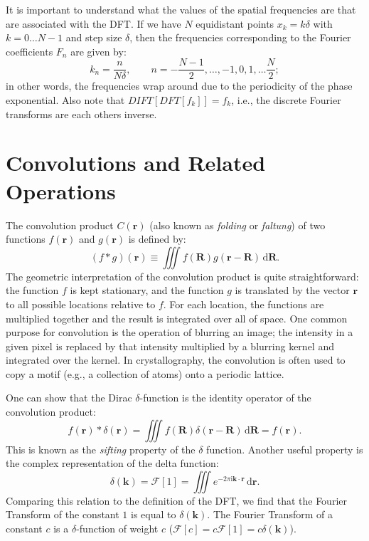It is important to understand what the values of the spatial frequencies are that are associated with the DFT.  If we have $N$ equidistant points $x_k=k\delta$ with $k=0\ldots N-1$ and step size $\delta$, then the frequencies corresponding to the Fourier coefficients $F_n$ are given by:
\[
	k_n = \frac{n}{N\delta},\qquad n=-\frac{N-1}{2},\ldots,-1,0,1,\ldots\frac{N}{2};
\]
in other words, the frequencies wrap around due to the periodicity of the phase exponential.  Also note that $DIFT[DFT[f_k]]=f_k$, i.e., the discrete Fourier transforms are each others inverse.




\section{Convolutions and Related Operations}\label{\chabbr:sec:Convolutions}

The convolution product $C(\mathbf{r})$ (also known as \textit{folding} or \textit{faltung}) of two functions $f(\mathbf{r})$ and $g(\mathbf{r})$ is defined by:
\begin{equation}
	(f\ast g)(\mathbf{r})\equiv \iiint f(\mathbf{R})g(\mathbf{r}-\mathbf{R})\,\mathrm{d}\mathbf{R}.\label{\chabbr:eq:convoldef}
\end{equation}
The geometric interpretation of the convolution product is quite straightforward: the function $f$ is kept stationary, and the function $g$ is translated by the vector $\mathbf{r}$ to all possible locations relative to $f$.  For each location, the functions are multiplied together and the result is integrated over all of space. One common purpose for convolution is the operation of blurring an image; the intensity in a given pixel is replaced by that intensity multiplied by a blurring kernel and integrated over the kernel. In crystallography, the convolution is often used to copy a motif (e.g., a collection of atoms) onto a periodic lattice.

One can show that the Dirac $\delta$-function is the identity operator of the convolution product:
\begin{equation}
	f(\mathbf{r})\ast \delta(\mathbf{r})= \iiint f(\mathbf{R})\delta(\mathbf{r}-\mathbf{R})\,\mathrm{d}\mathbf{R}=f(\mathbf{r}).\label{\chabbr:eq:sifting}
\end{equation}
This is known as the \textit{sifting} property of the $\delta$ function.  Another useful property is the complex representation of the delta function:
\begin{equation}
	\delta(\mathbf{k})=\mathcal{F}[1]=\iiint 
	e^{-2\pi\mathrm{i}\mathbf{k}\cdot\mathbf{r}}\,\mathrm{d}\mathbf{r}.
	\label{\chabbr:eq:complex}
\end{equation}
Comparing this relation to the definition of the DFT, we find that the Fourier Transform of the constant $1$ is equal to $\delta(\mathbf{k})$.  The Fourier Transform of a constant $c$ is a $\delta$-function of weight $c$ ($\mathcal{F}[c]=c\mathcal{F}[1]=c\delta(\mathbf{k})$).

